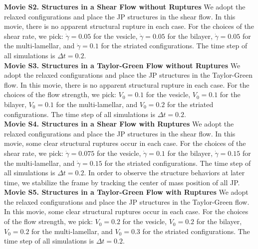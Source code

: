 \noindent
{\bf Movie S2. Structures in a Shear Flow without Ruptures} 
We adopt the relaxed configurations and place the JP structures in the shear flow. 
In this movie, there is no apparent structural rupture in each case. For the choices of the shear rate, we pick: $\dot\gamma = 0.05$ for the vesicle, $\dot\gamma = 0.05$ for the bilayer, 
$\dot\gamma = 0.05$ for the multi-lamellar, and $\dot\gamma = 0.1$ for the striated configurations.
The time step of all simulations is $\Delta t=0.2$.\\


\noindent
{\bf Movie S3. Structures in a Taylor-Green Flow without Ruptures} 
We adopt the relaxed configurations and place the JP structures in the Taylor-Green flow. 
In this movie, there is no apparent structural rupture in each case. For the choices of the flow strength, we pick: $V_0 = 0.1$ for the vesicle, $V_0 = 0.1$ for the bilayer, 
$V_0 = 0.1$ for the multi-lamellar, and $V_0 = 0.2$ for the striated configurations.
The time step of all simulations is $\Delta t=0.2$.\\


\noindent
{\bf Movie S4. Structures in a Shear Flow with Ruptures} 
We adopt the relaxed configurations and place the JP structures in the shear flow. 
In this movie, some clear structural ruptures occur in each case. For the choices of the shear rate, we pick: $\dot\gamma = 0.075$ for the vesicle, $\dot\gamma = 0.1$ for the bilayer, 
$\dot\gamma = 0.15$ for the multi-lamellar, and $\dot\gamma = 0.15$ for the striated configurations.
The time step of all simulations is $\Delta t=0.2$.
In order to observe the structure behaviors at later time, we stabilize the frame by tracking the center of mass position of all JP. \\


\noindent
{\bf Movie S5. Structures in a Taylor-Green Flow with Ruptures} 
We adopt the relaxed configurations and place the JP structures in the Taylor-Green flow. 
In this movie, some clear structural ruptures occur in each case. For the choices of the flow strength, we pick: $V_0 = 0.2$ for the vesicle, $V_0 = 0.2$ for the bilayer, 
$V_0 = 0.2$ for the multi-lamellar, and $V_0 = 0.3$ for the striated configurations.
The time step of all simulations is $\Delta t=0.2$.\\

